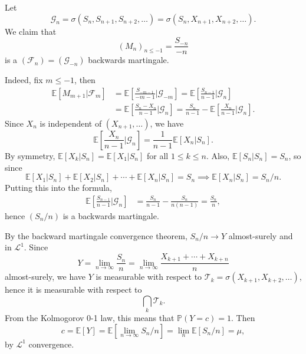 \documentclass[12pt]{article}
\begin{document}
\begin{proofbox}
	Let 
	\[
	\mathcal{G}_n = \sigma(S_n, S_{n+1}, S_{n+2}, \ldots) = \sigma(S_n, X_{n+1}, X_{n+2}, \ldots).
	\]
	We claim that
	\[
		(M_n)_{n \leq -1} = \frac{S_{-n}}{-n}
	\]
	is a $(\mathcal{F}_n) = (\mathcal{G}_{-n})$ backwards martingale.

	Indeed, fix $m \leq -1$, then
	\begin{align*}
		\mathbb{E}[M_{m + 1} | \mathcal{F}_m] &= \mathbb{E}\left[ \frac{S_{-m-1}}{-m-1} | \mathcal{G}_{-m} \right] = \mathbb{E}\left[ \frac{S_{n-1}}{n-1} | \mathcal{G}_n \right] \\
						    &= \mathbb{E}\left[ \frac{S_n - X_n}{n-1} | \mathcal{G}_n \right] = \frac{S_n}{n-1} - \mathbb{E}\left[ \frac{X_n}{n-1} | \mathcal{G}_n \right].
	\end{align*}
	Since $X_n$ is independent of $(X_{n+1}, \ldots)$, we have
	\[
	\mathbb{E}\left[ \frac{X_n}{n-1} | \mathcal{G}_n \right] = \frac{1}{n-1} \mathbb{E}[X_n | S_n].
	\]
	By symmetry, $\mathbb{E}[X_k | S_n] = \mathbb{E}[X_1 | S_n]$ for all $1 \leq k \leq n$. Also, $\mathbb{E}[S_n | S_n] = S_n$, so since
	\[
	\mathbb{E}[X_1 | S_n] + \mathbb{E}[X_2 | S_n] + \cdots + \mathbb{E}[X_n | S_n] = S_n \implies \mathbb{E}[X_n | S_n] = S_n/n.
	\]
	Putting this into the formula,
	\begin{align*}
		\mathbb{E}\left[\frac{S_{n-1}}{n-1} | \mathcal{G}_n \right] &= \frac{S_n}{n-1} - \frac{S_n}{n(n-1)} = \frac{S_n}{n},
	\end{align*}
	hence $(S_n/n)$ is a backwards martingale.

	By the backward martingale convergence theorem, $S_n/n \to Y$ almost-surely and in $\mathcal{L}^1$. Since
	\[
	Y = \lim_{n \to \infty} \frac{S_n}{n} = \lim_{n \to \infty} \frac{X_{k+1} + \cdots + X_{k+n}}{n}
	\]
	almost-surely, we have $Y$ is measurable with respect to $\mathcal{T}_k = \sigma(X_{k+1}, X_{k+2}, \ldots)$, hence it is measurable with respect to
	\[
	\bigcap_{k} \mathcal{T}_k.
	\]
	From the Kolmogorov 0-1 law, this means that $\mathbb{P}(Y = c) = 1$. Then
	\[
	c = \mathbb{E}[Y] = \mathbb{E}[\lim_{n \to \infty} S_n/n] = \lim_{n} \mathbb{E}[S_n/n] = \mu,
	\]
	by $\mathcal{L}^1$ convergence.
\end{proofbox}
\end{document}
